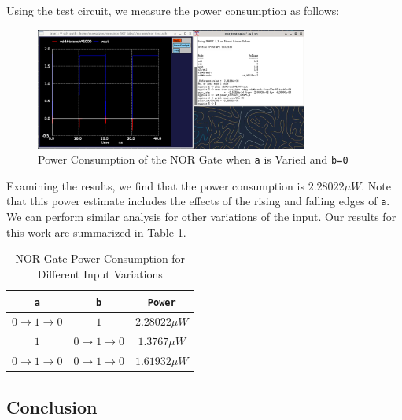 \documentclass[fleqn]{article}
\begin{document}
	\noindent Using the test circuit, we measure the power consumption as follows:
	
	\begin{figure}[H]
		\centerline{\includegraphics[width=0.8\textwidth]{nor_power_sweep_va.png}}
		\caption{Power Consumption of the NOR Gate when \texttt{a} is Varied and \texttt{b=0}}
		\label{fig::nor_power_sweep_va}
	\end{figure}
	
	\noindent Examining the results, we find that the power consumption is $2.28022{\mu}W$. Note that this power estimate includes the effects of the rising and falling edges of \texttt{a}. We can perform similar analysis for other variations of the input. Our results for this work are summarized in Table \ref{table::nor_gate_power_analysis}.
	
	\begin{table}[H]
	\begin{center}
	\caption{NOR Gate Power Consumption for Different Input Variations}
	\label{table::nor_gate_power_analysis}
	\begin{tabular}{| c | c | c |}
		\hline
		\texttt{a} & \texttt{b} & \texttt{Power}\\
		\hline	
		$0 \rightarrow 1 \rightarrow 0$ & $1$ & $2.28022{\mu}W$ \\
		\hline	
		$1$ & $0 \rightarrow 1 \rightarrow 0$ & $1.3767{\mu}W$ \\
		\hline	
		$0 \rightarrow 1 \rightarrow 0$ & $0 \rightarrow 1 \rightarrow 0$ & $1.61932{\mu}W$\\
		\hline
	\end{tabular}
	\end{center}
	\end{table}
	
	\subsection{Conclusion}
	
\end{document}
